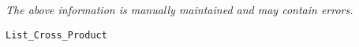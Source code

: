 \label{pkg:list\_cross\_product}

{\tiny \it The above information is manually maintained and may contain errors.}
\begin{verbatim}
List_Cross_Product
\end{verbatim}
